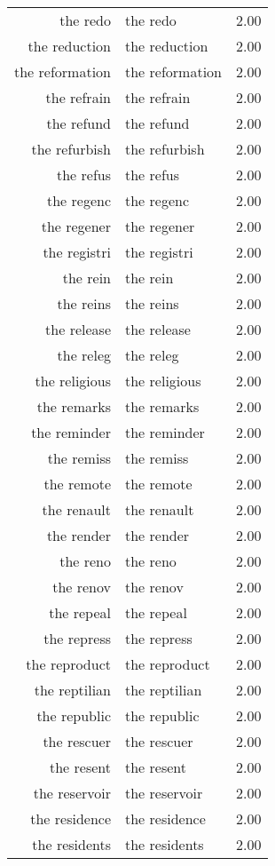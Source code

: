 \begin{table}[ht]
\begin{tabular}{rlr}
  the redo & the redo & 2.00 \\ 
  the reduction & the reduction & 2.00 \\ 
  the reformation & the reformation & 2.00 \\ 
  the refrain & the refrain & 2.00 \\ 
  the refund & the refund & 2.00 \\ 
  the refurbish & the refurbish & 2.00 \\ 
  the refus & the refus & 2.00 \\ 
  the regenc & the regenc & 2.00 \\ 
  the regener & the regener & 2.00 \\ 
  the registri & the registri & 2.00 \\ 
  the rein & the rein & 2.00 \\ 
  the reins & the reins & 2.00 \\ 
  the release & the release & 2.00 \\ 
  the releg & the releg & 2.00 \\ 
  the religious & the religious & 2.00 \\ 
  the remarks & the remarks & 2.00 \\ 
  the reminder & the reminder & 2.00 \\ 
  the remiss & the remiss & 2.00 \\ 
  the remote & the remote & 2.00 \\ 
  the renault & the renault & 2.00 \\ 
  the render & the render & 2.00 \\ 
  the reno & the reno & 2.00 \\ 
  the renov & the renov & 2.00 \\ 
  the repeal & the repeal & 2.00 \\ 
  the repress & the repress & 2.00 \\ 
  the reproduct & the reproduct & 2.00 \\ 
  the reptilian & the reptilian & 2.00 \\ 
  the republic & the republic & 2.00 \\ 
  the rescuer & the rescuer & 2.00 \\ 
  the resent & the resent & 2.00 \\ 
  the reservoir & the reservoir & 2.00 \\ 
  the residence & the residence & 2.00 \\ 
  the residents & the residents & 2.00 \\ 

\end{tabular}
\end{table}
